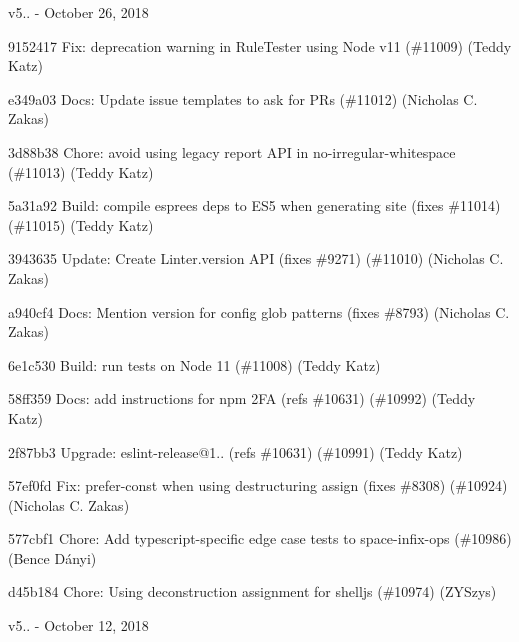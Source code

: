 v5.. -\/ October 26, 2018


\begin{DoxyItemize}
\item 9152417 Fix\+: deprecation warning in Rule\+Tester using Node v11 (\#11009) (Teddy Katz)
\item e349a03 Docs\+: Update issue templates to ask for PRs (\#11012) (Nicholas C. Zakas)
\item 3d88b38 Chore\+: avoid using legacy report API in no-\/irregular-\/whitespace (\#11013) (Teddy Katz)
\item 5a31a92 Build\+: compile espree\textquotesingle{}s deps to ES5 when generating site (fixes \#11014) (\#11015) (Teddy Katz)
\item 3943635 Update\+: Create Linter.\+version API (fixes \#9271) (\#11010) (Nicholas C. Zakas)
\item a940cf4 Docs\+: Mention version for config glob patterns (fixes \#8793) (Nicholas C. Zakas)
\item 6e1c530 Build\+: run tests on Node 11 (\#11008) (Teddy Katz)
\item 58ff359 Docs\+: add instructions for npm 2FA (refs \#10631) (\#10992) (Teddy Katz)
\item 2f87bb3 Upgrade\+: eslint-\/release@1.. (refs \#10631) (\#10991) (Teddy Katz)
\item 57ef0fd Fix\+: prefer-\/const when using destructuring assign (fixes \#8308) (\#10924) (Nicholas C. Zakas)
\item 577cbf1 Chore\+: Add typescript-\/specific edge case tests to space-\/infix-\/ops (\#10986) (Bence Dányi)
\item d45b184 Chore\+: Using deconstruction assignment for shelljs (\#10974) (ZYSzys)
\end{DoxyItemize}

v5.. -\/ October 12, 2018


